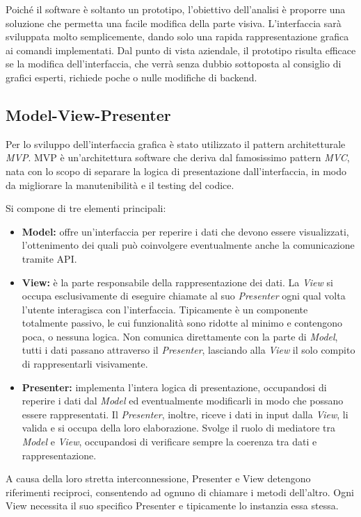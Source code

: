 \documentclass[12pt,a4paper,openright,twoside]{book}
\newcommand{\itemdef}[1]{\item \textbf{#1}}
\begin{document}
Poiché il software è soltanto un prototipo, l'obiettivo dell'analisi è proporre una soluzione che permetta una facile modifica della parte visiva.
L'interfaccia sarà sviluppata molto semplicemente, dando solo una rapida rappresentazione grafica ai comandi implementati.
Dal punto di vista aziendale, il prototipo risulta efficace se la modifica dell'interfaccia, che verrà senza dubbio sottoposta al consiglio di grafici esperti, richiede poche o nulle modifiche di backend.

\subsection{Model-View-Presenter}
\label{ssec:analisi-mvp}

Per lo sviluppo dell'interfaccia grafica è stato utilizzato il pattern architetturale \textit{\gls{MVP}}.
\gls{MVP} è un'architettura software che deriva dal famosissimo pattern \textit{\gls{MVC}}, nata con lo scopo di separare la logica di presentazione dall'interfaccia, in modo da migliorare la manutenibilità e il testing del codice.

Si compone di tre elementi principali:
\begin{itemize}
	\itemdef{Model:}
	offre un'interfaccia per reperire i dati che devono essere visualizzati, l'ottenimento dei quali può coinvolgere eventualmente anche la comunicazione tramite API.
	
	\itemdef{View:}
	è la parte responsabile della rappresentazione dei dati.
	La \textit{View} si occupa esclusivamente di eseguire chiamate al suo \textit{Presenter} ogni qual volta l'utente interagisca con l'interfaccia.
	Tipicamente è un componente totalmente passivo, le cui funzionalità sono ridotte al minimo e contengono poca, o nessuna logica.
	Non comunica direttamente con la parte di \textit{Model}, tutti i dati passano attraverso il \textit{Presenter}, lasciando alla \textit{View} il solo compito di rappresentarli visivamente.
	
	\itemdef{Presenter:} implementa l'intera logica di presentazione, occupandosi
	di reperire i dati dal \textit{Model} ed eventualmente modificarli in modo che
	possano essere rappresentati.
	Il \textit{Presenter}, inoltre, riceve i dati in input dalla \textit{View}, li valida e si occupa della loro elaborazione.
	Svolge il ruolo di mediatore tra \textit{Model} e \textit{View}, occupandosi di verificare sempre la coerenza tra dati e rappresentazione.
\end{itemize}
A causa della loro stretta interconnessione, Presenter e View detengono riferimenti reciproci, consentendo ad ognuno di chiamare i metodi dell'altro.
Ogni View necessita il suo specifico Presenter e tipicamente lo instanzia essa stessa.
\end{document}
